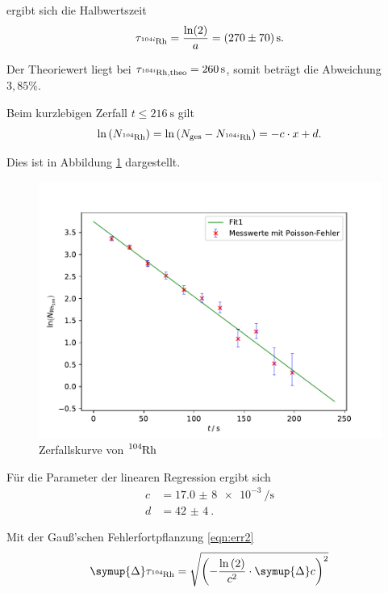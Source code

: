 ergibt sich die Halbwertszeit
\begin{equation*}
  \tau_{\ce{^{104i}Rh}} = \frac{\ln(2)}{a} = \SI{270(70)}{\s}.
\end{equation*}

Der Theoriewert \cite{sample3} liegt bei $\tau_{\ce{^{104i}Rh}, \text{theo}} = \SI{260}{\s}$, somit beträgt die Abweichung $3,85 \%$.

Beim kurzlebigen Zerfall $t \leq \SI{216}{\s}$ gilt
\begin{equation*}
  \ln{\left(N_{\ce{^{104}Rh}}\right)} = \ln{\left(N_\text{ges} - N_{\ce{^{104i}Rh}}\right)} = -c \cdot x + d.
\end{equation*}

Dies ist in Abbildung \ref{fig:r2} dargestellt.
\begin{figure}[H]
  \centering
  \includegraphics[width=\textwidth]{Plots/rhod.pdf}
  \caption{Zerfallskurve von $\ce{^{104}Rh}$}
  \label{fig:r2}
\end{figure}

Für die Parameter der linearen Regression ergibt sich
\begin{align*}
  c &= \SI{17,0(8)e-3}{\per \s} \\
  d &= \SI{42(4)}{}.
\end{align*}

Mit der Gauß'schen Fehlerfortpflanzung \eqref{eqn:err2}
\begin{equation}
  \symup{\Delta} \tau_{\ce{^{104}Rh}} = \sqrt{\left(-\frac{\ln{(2)}}{c^2} \cdot \symup{\Delta}c \right)^2}
  \label{eqn:err2}
\end{equation}


